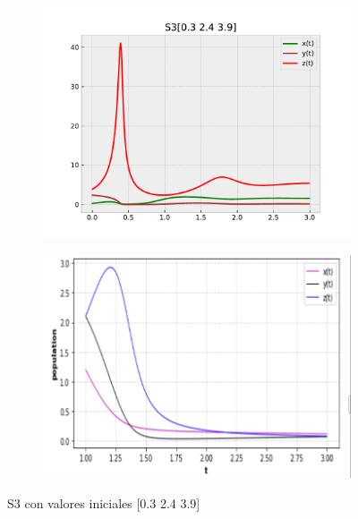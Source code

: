 \documentclass{wscpaperproc}
\theoremstyle{wsc}
\begin{document}
\begin{figure}[h]
	\centering
	\begin{subfigure}[b]{0.5\textwidth}
		\centering
		\includegraphics[width=\textwidth]{Simulations/S3[0.3 2.4 3.9].pdf}
	
		\label{fig:comparativa71}
	\end{subfigure}%
	\begin{subfigure}[b]{0.5\textwidth}
		\centering
		\includegraphics[width=\textwidth]{GraficasPaper/S1[3].png}
		\label{fig:comparativa72}
	\end{subfigure}
	\caption{S3 con valores iniciales [0.3 2.4 3.9]}

	\label{fig:comparacion9}
\end{figure}
\end{document}
